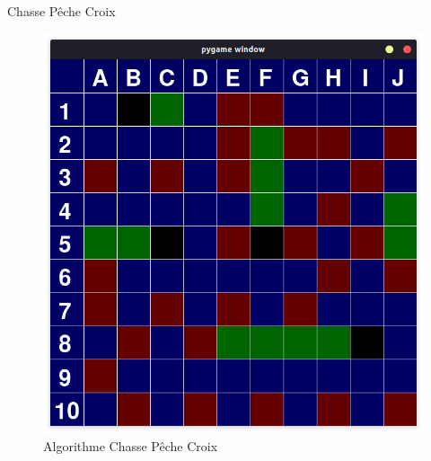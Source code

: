 	\begin{frame}{Chasse Pêche Croix}
		\begin{figure}
		    \centering
		    \includegraphics[width=.5\linewidth]{images/algoCPC.png}
		    \caption*{Algorithme Chasse Pêche Croix}
		    \label{fig:CPC}
		\end{figure}{}
	\end{frame}
	

